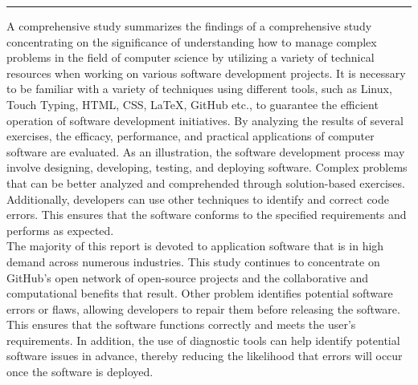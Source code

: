 \documentclass[12pt, A4]{report}
\begin{document}
\rule{\textwidth}{0.1pt}
    \noindent 
    \justifying A comprehensive study summarizes the findings of a comprehensive study concentrating on the significance of understanding how to manage complex problems in the field of computer science by utilizing a variety of technical resources when working on various software development projects. It is necessary to be familiar with a variety of techniques using different tools, such as Linux, Touch Typing, HTML, CSS, LaTeX, GitHub etc., to guarantee the efficient operation of software development initiatives. By analyzing the results of several exercises, the efficacy, performance, and practical applications of computer software are evaluated. As an illustration, the software development process may involve designing, developing, testing, and deploying software. Complex problems that can be better analyzed and comprehended through solution-based exercises. Additionally, developers can use other techniques to identify and correct code errors. This ensures that the software conforms to the specified requirements and performs as expected.\\
    
    The majority of this report is devoted to application software that is in high demand across numerous industries. This study continues to concentrate on GitHub's open network of open-source projects and the collaborative and computational benefits that result. Other problem identifies potential software errors or flaws, allowing developers to repair them before releasing the software. This ensures that the software functions correctly and meets the user's requirements. In addition, the use of diagnostic tools can help identify potential software issues in advance, thereby reducing the likelihood that errors will occur once the software is deployed.
\end{document}
